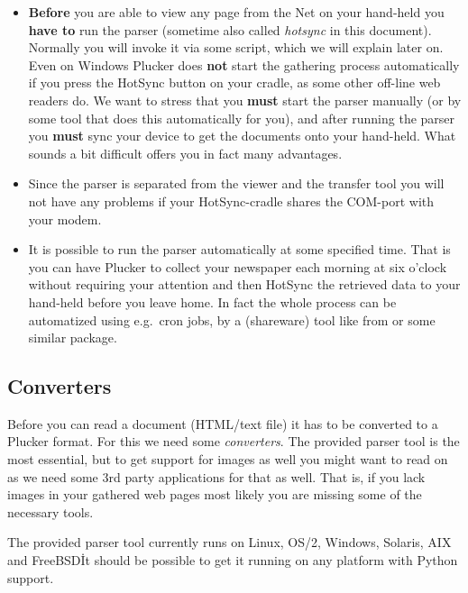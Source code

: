 \begin{itemize}

  \item \textbf{Before} you are able to view any page from the Net on
  your hand-held you \textbf{have to} run the parser (sometime also 
  called \emph{hotsync} in this document). Normally you will invoke 
  it via some script, which we will explain later on.  Even on Windows 
  Plucker does \textbf{not} start the gathering process automatically 
  if you press the HotSync button on your cradle, as some other off-line 
  web readers do. We want to stress that you \textbf{must} start the 
  parser manually (or by some tool that does this automatically for you), 
  and after running the parser you \textbf{must} sync your device to get 
  the documents onto your hand-held. What sounds a bit difficult offers 
  you in fact many advantages.

  \item Since the parser is separated from the viewer and the transfer
  tool you will not have any problems if your HotSync-cradle shares the 
  COM-port with your modem.

  \item It is possible to run the parser automatically at some
  specified time.  That is you can have Plucker to collect your
  newspaper each morning at six o'clock without requiring your 
  attention and then HotSync the retrieved data to your hand-held
  before you leave home. In fact the whole process can be automatized
  using e.g.\ cron jobs,  by a (shareware) tool like  
  from \textit{}
  or some similar package.

\end{itemize}

\subsection{Converters}

Before you can read a document (HTML/text file) it has to be converted
to a Plucker format. For this we need some \emph{converters}. The
provided parser tool is the most essential, but to get support for
images as well you might want to read on as we need some 3rd party
applications for that as well. That is, if you lack images in your
gathered web pages most likely you are missing some of the necessary 
tools.

The provided parser tool currently runs on Linux, OS/2, Windows,
Solaris, AIX and FreeBSD\. It should be possible to get it running on
any platform with Python support.\\


